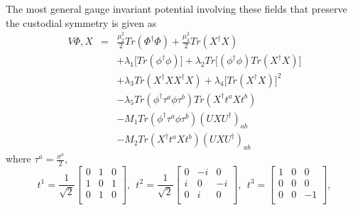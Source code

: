 The most general gauge invariant potential involving these fields that preserve the custodial symmetry is given as
\begin{eqnarray}
    V{\Phi,X} & = & \frac{\mu_2^2}{2}Tr(\Phi^{\dagger}\Phi) + \frac{\mu_3^2}{2}Tr(X^{\dagger}X)  \nonumber \\
            & & + \lambda_1\Big[ Tr(\phi^\dagger \phi)\Big] + \lambda_2 Tr\Big[ (\phi^{\dagger} \phi) Tr(X^{\dagger}X) \Big] \nonumber \\
            & & + \lambda_3 Tr(X^{\dagger}XX^{\dagger}X) + \lambda_4 \Big[ Tr(X^{\dagger}X) \Big]^2  \nonumber \\
            & & -\lambda_5 Tr(\phi^{\dagger} \tau^a \phi \tau^b) Tr(X^{\dagger} t^a X t^b)   \nonumber \\
            & & -M_1 Tr(\phi^{\dagger} \tau^a \phi \tau^b) (UXU^{\dagger})_{ab} \nonumber \\
            & & -M_2 Tr(X^{\dagger} t^a X t^b)(UXU^{\dagger})_{ab}
\end{eqnarray}
where $\tau^a = \frac{\sigma^a}{2}$,
\begin{equation}
    t^1=\frac{1}{\sqrt{2}}
        \begin{bmatrix}
        0   &   1 & 0 \\
        1   &   0 & 1 \\
        0   &   1 & 0   \\
        \end{bmatrix},~~
    t^2 = \frac{1}{\sqrt{2}}
        \begin{bmatrix}
        0   &   -i & 0 \\
        i   &   0 & -i \\
        0   &   i & 0   \\
        \end{bmatrix},~~
    t^3 = 
        \begin{bmatrix}
        1   &   0 & 0 \\
        0   &   0 & 0 \\
        0   &   0 & -1   \\
        \end{bmatrix},
\end{equation}\

